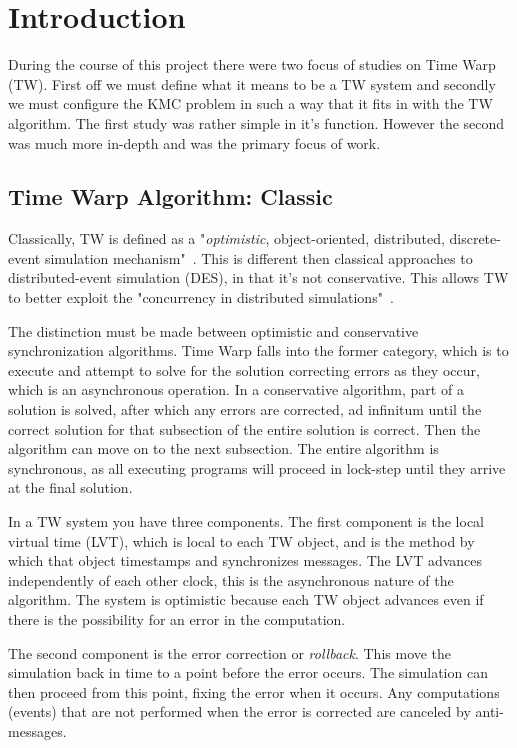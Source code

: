 
\section{Introduction}

During the course of this project there were two focus of studies on Time Warp (TW).  First off we must define what it means to be a TW system and secondly we must configure the KMC problem in such a way that it fits in with the TW algorithm.  The first study was rather simple in it's function.  However the second was much more in-depth and was the primary focus of work.

\subsection{Time Warp Algorithm: Classic}

Classically, TW is defined as a "\textit{optimistic}, object-oriented, distributed, discrete-event simulation mechanism"~\cite{obgl:tw}.  This is different then classical approaches to distributed-event simulation (DES), in that it's not conservative.  This allows TW to better exploit the "concurrency in distributed simulations"~\cite{obgl:tw}.

The distinction must be made between optimistic and conservative synchronization algorithms.  Time Warp falls into the former category, which is to execute and attempt to solve for the solution correcting errors as they occur, which is an asynchronous operation.  In a conservative algorithm, part of a solution is solved, after which any errors are corrected, ad infinitum until the correct solution for that subsection of the entire solution is correct.  Then the algorithm can move on to the next subsection.  The entire algorithm is synchronous, as all executing programs will proceed in lock-step until they arrive at the final solution.

In a TW system you have three components.  The first component is the local virtual time (LVT), which is local to each TW object, and is the method by which that object timestamps and synchronizes messages.  The LVT advances independently of each other clock, this is the asynchronous nature of the algorithm.  The system is optimistic because each TW object advances even if there is the possibility for an error in the computation.

The second component is the error correction or \textit{rollback}.  This move the simulation back in time to a point before the error occurs.  The simulation can then proceed from this point, fixing the error when it occurs.  Any computations (events) that are not performed when the error is corrected are canceled by anti-messages.

